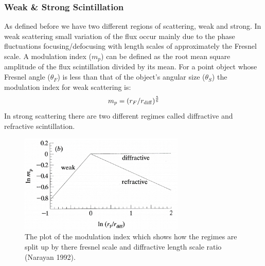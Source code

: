 \documentclass[10pt,a4paper]{article}
\begin{document}
\subsubsection{Weak \& Strong Scintillation}
As defined before we have two different regions of scattering, weak and strong. In weak scattering small variation of the flux occur mainly due to the phase fluctuations focusing/defocusing with length scales of approximately the Fresnel scale. A modulation index ($m_p$) can be defined as the root mean square amplitude of the flux scintillation divided by its mean. For a point object whose Fresnel angle ($\theta_F$) is less than that of the object's angular size ($\theta_S$) the modulation index for weak scattering is:
\begin{equation}
    m_{p}=(r_{F}/r_{\ce{diff}})^{\frac{5}{6}}
\end{equation}
In strong scattering there are two different regimes called diffractive and refractive scintillation. 
\begin{figure}[H]
\begin{center}
	\includegraphics[width=0.7\textwidth]{scatt1}
	\caption{The plot of the modulation index which shows how the regimes are split up by there fresnel scale and diffractive length scale ratio (Narayan 1992).}
	\label{scatt}
\end{center}
\end{figure}
\end{document}
